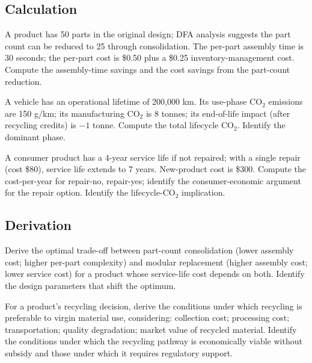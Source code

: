 \subsection*{Calculation}

\begin{exercise}
A product has 50 parts in the original design; DFA analysis suggests the part count can be reduced to 25 through consolidation. The per-part assembly time is 30 seconds; the per-part cost is \$0.50 plus a \$0.25 inventory-management cost. Compute the assembly-time savings and the cost savings from the part-count reduction.
\end{exercise}

\begin{exercise}
A vehicle has an operational lifetime of 200{,}000 km. Its use-phase CO$_2$ emissions are 150 g/km; its manufacturing CO$_2$ is 8 tonnes; its end-of-life impact (after recycling credits) is $-1$ tonne. Compute the total lifecycle CO$_2$. Identify the dominant phase.
\end{exercise}

\begin{exercise}
A consumer product has a 4-year service life if not repaired; with a single repair (cost \$80), service life extends to 7 years. New-product cost is \$300. Compute the cost-per-year for repair-no, repair-yes; identify the consumer-economic argument for the repair option. Identify the lifecycle-CO$_2$ implication.
\end{exercise}

\subsection*{Derivation}

\begin{exercise}
Derive the optimal trade-off between part-count consolidation (lower assembly cost; higher per-part complexity) and modular replacement (higher assembly cost; lower service cost) for a product whose service-life cost depends on both. Identify the design parameters that shift the optimum.
\end{exercise}

\begin{exercise}
For a product's recycling decision, derive the conditions under which recycling is preferable to virgin material use, considering: collection cost; processing cost; transportation; quality degradation; market value of recycled material. Identify the conditions under which the recycling pathway is economically viable without subsidy and those under which it requires regulatory support.
\end{exercise}

